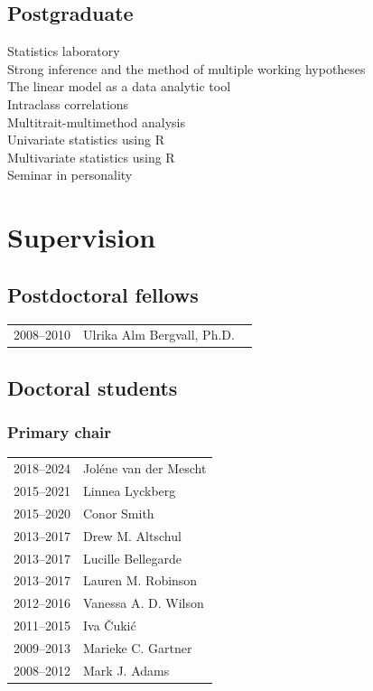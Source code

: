 \documentclass[11pt]{article}
\begin{document}
\subsection*{Postgraduate}
Statistics laboratory \\
Strong inference and the method of multiple working hypotheses \\
The linear model as a data analytic tool \\
Intraclass correlations \\
Multitrait-multimethod analysis \\
Univariate statistics using R \\
Multivariate statistics using R \\
Seminar in personality

\section*{Supervision}
\subsection*{Postdoctoral fellows}

\begin{tabular}{p{3cm}p{12cm}}
  2008--2010 & Ulrika Alm Bergvall, Ph.D. \
\end{tabular}

\subsection*{Doctoral students}

\subsubsection*{Primary chair}
\begin{tabular}{p{3cm}p{12cm}}
  2018--2024 & Joléne van der Mescht \\
  2015--2021 & Linnea Lyckberg \\
  2015--2020 & Conor Smith \\
  2013--2017 & Drew M. Altschul \\
  2013--2017 & Lucille Bellegarde \\
  2013--2017 & Lauren M. Robinson \\
  2012--2016 & Vanessa A. D. Wilson \\
  2011--2015 & Iva Čukić \\
  2009--2013 & Marieke C. Gartner \\
  2008--2012 & Mark J. Adams
\end{tabular}
\end{document}
